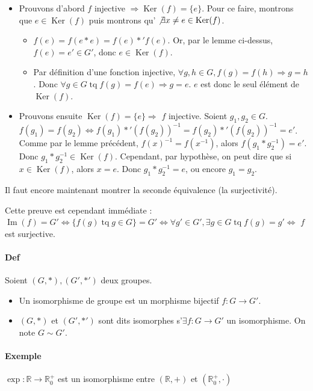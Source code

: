 \documentclass{article}
\DeclareMathOperator{\tq}{\text{ tq }}
\DeclareMathOperator{\Imappl}{Im}
\DeclareMathOperator{\Ker}{Ker}
\begin{document}
			\begin{itemize}
				\item Prouvons d'abord $f$ injective $\Rightarrow \Ker(f) = \{e\}$. Pour ce faire, montrons que $e \in \Ker(f)$ puis montrons qu'
				$\not \exists x \neq e \in \Ker(f)$.
				\begin{itemize}
					\item $f(e) = f(e *e) = f(e) *' f(e)$. Or, par le lemme ci-dessus, $f(e) = e' \in G'$, donc $e \in \Ker(f)$.
					\item Par définition d'une fonction injective, $\forall g, h \in G, f(g) = f(h) \Rightarrow g = h$. Donc $\forall g \in G \tq
					f(g) = f(e) \Rightarrow g = e$. $e$ est donc le seul élément de $\Ker(f)$.
				\end{itemize}

				\item Prouvons ensuite $\Ker(f) = \{e\} \Rightarrow$ $f$ injective. Soient $g_1, g_2 \in G$. $f(g_1) = f(g_2) \Leftrightarrow
				f(g_1) *' (f(g_2))^{-1} = f(g_2) *' (f(g_2 ))^{-1} = e'$. Comme par le lemme précédent, $f(x)^{-1} = f(x^{-1})$, alors
				$f(g_1 * g_2^{-1}) = e'$. Donc $g_1 * g_2^{-1} \in \Ker(f)$. Cependant, par hypothèse, on peut dire que si $x \in \Ker(f)$, alors
				$x = e$. Donc $g_1 * g_2^{-1} = e$, ou encore $g_1 = g_2$.
			\end{itemize}

			Il faut encore maintenant montrer la seconde équivalence (la surjectivité).

			Cette preuve est cependant immédiate :
			$\Imappl(f) = G' \iff \{f(g) \tq g \in G\} = G' \iff \forall g' \in G', \exists g \in G \tq f(g) = g' \iff$ $f$ est surjective.

			\paragraph{Def} Soient $(G, *), (G', *')$ deux groupes.

			\begin{itemize}
				\item Un isomorphisme de groupe est un morphisme bijectif $f : G \to G'$.
				\item $(G, *)$ et $(G', *')$ sont dits isomorphes s'$\exists f : G \to G'$ un isomorphisme. On note $G \sim G'$.
			\end{itemize}

			\paragraph{Exemple} $\exp : \mathbb R \to \mathbb R_0^+$ est un isomorphisme entre $(\mathbb R, +)$ et $(\mathbb R_0^+, \cdot)$
\end{document}
